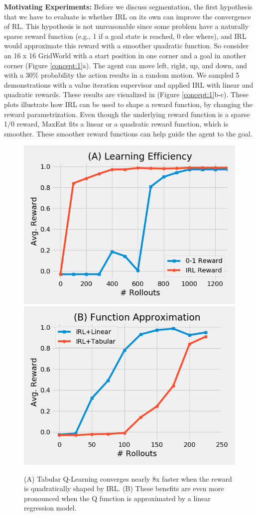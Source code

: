 \vspace{0.5em} \noindent \textbf{Motivating Experiments: } Before we discuss segmentation, the first hypothesis that we have to evaluate is whether IRL on its own can improve the convergence of RL. This hypothesis is not unreasonable since some problem have a naturally sparse reward function (e.g., 1 if a goal state is reached, 0 else where), and IRL would approximate this reward with a smoother quadratic function. So consider an 16 x 16 GridWorld with a start position in one corner and a goal in another corner (Figure \ref{concept:1}a). 
The agent can move left, right, up, and down, and with a 30\% probability the action results in a random motion.
We sampled 5 demonstrations with a value iteration supervisor and applied IRL with linear and quadratic rewards. These results are visualized in (Figure \ref{concept:1}b-c).
These plots illustrate how IRL can be used to shape a reward function, by changing the reward parametrization. Even though the underlying reward function is a sparse 1/0 reward,  MaxEnt fits a linear or a quadratic reward function, which is smoother. These smoother reward functions can help guide the agent to the goal.

\begin{figure}[t]
\centering
 \includegraphics[width=0.48\columnwidth]{concept/1.png}
  \includegraphics[width=0.48\columnwidth]{concept/2.png}
 \caption{(A) Tabular Q-Learning converges nearly 8x faster when the reward is quadratically shaped by IRL. (B) These benefits are even more pronounced when the Q function is approximated by a linear regression model. \label{concept:2}}
\end{figure}

